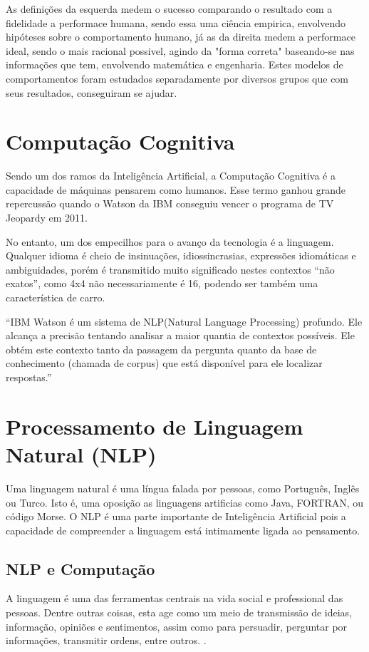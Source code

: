 \documentclass[
	12pt,				%
	openright,			%
	oneside,			%
	a4paper,			%
	english,			%
	spanish,			%
	brazil				%
	]{abntex2}
\begin{document}
	As definições da esquerda medem o sucesso comparando o resultado com a fidelidade a performace humana, sendo essa uma ciência empirica, envolvendo hipóteses sobre o comportamento humano, já as da direita medem a performace ideal, sendo o mais racional possivel, agindo da "forma correta" baseando-se nas informações que tem, envolvendo matemática e engenharia. Estes modelos de comportamentos foram estudados separadamente por diversos grupos que com seus resultados, conseguiram se ajudar. \citeauthor{norvig}
	 
	
	\section{Computação Cognitiva}

	Sendo um dos ramos da Inteligência Artificial, a Computação Cognitiva é a capacidade de máquinas pensarem como humanos. Esse termo ganhou grande repercussão quando o Watson da IBM conseguiu vencer o programa de TV Jeopardy em 2011.

	No entanto, um dos empecilhos para o avanço da tecnologia é a linguagem. Qualquer idioma é cheio de insinuações, idiossincrasias, expressões idiomáticas e ambiguidades, porém é transmitido muito significado nestes contextos “não exatos”, como 4x4 não necessariamente é 16, podendo ser também uma característica de carro.

	“IBM Watson é um sistema de NLP(Natural Language Processing) profundo. Ele alcança a precisão tentando analisar a maior quantia de contextos possíveis. Ele obtém este contexto tanto da passagem da pergunta quanto da base de conhecimento (chamada de corpus) que está disponível para ele localizar respostas.” \cite{watson_manual} 

	\section{Processamento de Linguagem Natural (NLP)}
	Uma linguagem natural é uma língua falada por pessoas, como Português, Inglês ou Turco. Isto é, uma oposição as linguagens artificias como Java, FORTRAN, ou código Morse. O NLP é uma parte importante de Inteligência Artificial pois a capacidade de compreender a linguagem está intimamente ligada ao pensamento.
	
		\subsection*{NLP e Computação}
		A linguagem é uma das ferramentas centrais na vida social e professional das pessoas. Dentre outras coisas, esta age como um meio de transmissão de ideias, informação, opiniões e sentimentos, assim como para persuadir, perguntar por informações, transmitir ordens, entre outros. \cite{book_natural_lang}.
		
\end{document}
